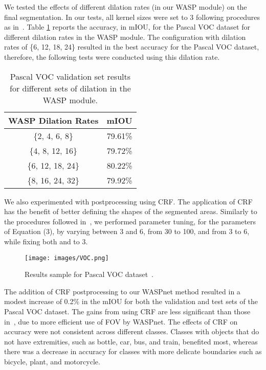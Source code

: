\documentclass[sensors,article,accept,moreauthors,pdftex]{Definitions/mdpi}
\begin{document}
We tested the effects of different dilation rates (in our WASP module) on the final segmentation. In our tests, all kernel sizes were set to 3 following procedures as in~\cite{DeepLab}. Table \ref{tab:DilationRates} reports the accuracy, in mIOU, for the Pascal VOC dataset for different dilation rates in the WASP module.
The configuration with dilation rates of \{6, 12, 18, 24\} resulted in the best accuracy for the Pascal VOC dataset, therefore, the following tests were conducted using this dilation rate.

\begin{table}[H]
\caption{Pascal VOC validation set results for different sets of dilation in the WASP module.}
\centering
\begin{tabular}{cc}
\toprule
\textbf{WASP Dilation Rates} & \textbf{mIOU}\\
\midrule
\{2, 4, 6, 8\}&79.61\%\\
\{4, 8, 12, 16\}&79.72\%\\
\{6, 12, 18, 24\}&80.22\%\\
\{8, 16, 24, 32\}&79.92\%\\
\bottomrule
\end{tabular}
\label{tab:DilationRates}
\end{table}




We also experimented with postprocessing using CRF. The application of CRF has the benefit of better defining the shapes of the segmented areas.
Similarly to the procedures followed in~\cite{DeepLab}, we performed parameter tuning, for the parameters of Equation (3), by varying  between 3 and 6,  from 30 to 100, and  from 3 to 6, while fixing both  and  to 3.

\begin{figure}[H]
\centering
\texttt{[image: images/VOC.png]}
\caption{Results sample for Pascal VOC dataset~\cite{Pascal}.}
\label{fig:ImagesVOC}
\end{figure}

The addition of CRF postprocessing to our WASPnet method resulted in a modest increase of 0.2\% in the mIOU for both the validation and test sets of the Pascal VOC dataset. The gains from using CRF are less significant than those in~\cite{DeepLab}, due to more efficient use of FOV by WASPnet.
The effects of CRF on accuracy were not consistent across different classes.
Classes with objects that do not have extremities, such as bottle, car, bus, and train, benefited most, whereas there was a decrease in accuracy for classes with more delicate boundaries such as bicycle, plant, and motorcycle.
\end{document}
